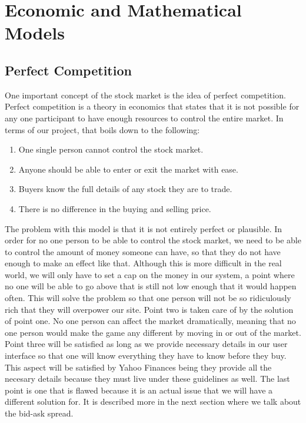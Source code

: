 \section{Economic and Mathematical Models}
\label{econmodels}
\subsection{Perfect Competition}

One important concept of the stock market is the idea of perfect competition. Perfect competition is a theory in economics that states that it is not possible for any one participant to have enough resources to control the entire market. In terms of our project, that boils down to the following:
\begin{enumerate}
\item
One single person cannot control the stock market.\cite{inv:pcomp} 
\item
Anyone should be able to enter or exit the market with ease.
\item
Buyers know the full details of any stock they are to trade.
\item
There is no difference in the buying and selling price.\cite{wiki:pcomp}
\end{enumerate}
The problem with this model is that it is not entirely perfect or plausible. In order for no one person to be able to control the stock market, we need to be able to control the amount of money someone can have, so that they do not have enough to make an effect like that. Although this is more difficult in the real world, we will only have to set a cap on the money in our system, a point where no one will be able to go above that is still not low enough that it would happen often. This will solve the problem so that one person will not be so ridiculously rich that they will overpower our site. Point two is taken care of by the solution of point one. No one person can affect the market dramatically, meaning that no one person would make the game any different by moving in or out of the market. Point three will be satisfied as long as we provide necessary details in our user interface so that one will know everything they have to know before they buy. This aspect will be satisfied by Yahoo Finances being they provide all the necesary details because they must live under these guidelines as well. The last point is one that is flawed because it is an actual issue that we will have a different solution for. It is described more in the next section where we talk about the bid-ask spread.

